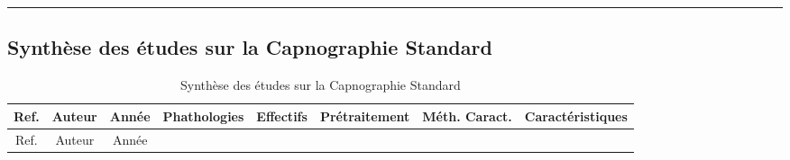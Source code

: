 \documentclass[12pt,]{article}
\begin{document}
\newpage
\begin{landscape}

\begin{center}\rule{0.5\linewidth}{0.5pt}\end{center}

\hypertarget{synthuxe8se-des-uxe9tudes-sur-la-capnographie-standard}{%
\subsection{Synthèse des études sur la Capnographie
Standard}\label{synthuxe8se-des-uxe9tudes-sur-la-capnographie-standard}}

\begin{longtable}[]{@{}ccccclll@{}}
\caption{Synthèse des études sur la Capnographie
Standard}\tabularnewline
\toprule
\begin{minipage}[b]{0.14\columnwidth}\centering
Ref.\strut
\end{minipage} & \begin{minipage}[b]{0.09\columnwidth}\centering
Auteur\strut
\end{minipage} & \begin{minipage}[b]{0.08\columnwidth}\centering
Année\strut
\end{minipage} & \begin{minipage}[b]{0.11\columnwidth}\centering
Phathologies\strut
\end{minipage} & \begin{minipage}[b]{0.08\columnwidth}\centering
Effectifs\strut
\end{minipage} & \begin{minipage}[b]{0.09\columnwidth}\raggedright
Prétraitement\strut
\end{minipage} & \begin{minipage}[b]{0.08\columnwidth}\raggedright
Méth. Caract.\strut
\end{minipage} & \begin{minipage}[b]{0.11\columnwidth}\raggedright
Caractéristiques\strut
\end{minipage}\tabularnewline
\midrule
\endfirsthead
\toprule
\begin{minipage}[b]{0.14\columnwidth}\centering
Ref.\strut
\end{minipage} & \begin{minipage}[b]{0.09\columnwidth}\centering
Auteur\strut
\end{minipage} & \begin{minipage}[b]{0.08\columnwidth}\centering
Année\strut
\end{minipage} & \begin{minipage}[b]{0.11\columnwidth}\centering

\end{minipage}
\end{longtable}
\end{landscape}
\end{document}
